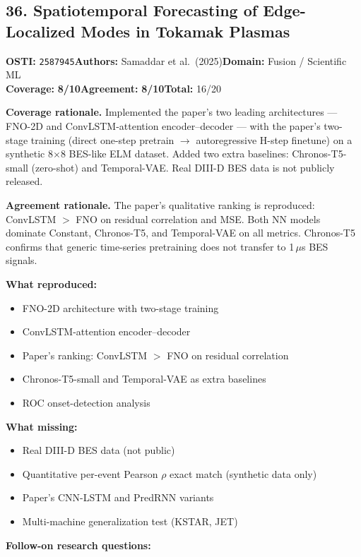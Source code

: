 \documentclass[11pt]{article}
\newcommand{\scorebadge}[2]{\textbf{#1:} \textbf{#2/10}}
\begin{document}
\subsection{36. Spatiotemporal Forecasting of Edge-Localized Modes in Tokamak Plasmas}
\textbf{OSTI:} \texttt{2587945}\quad\textbf{Authors:} Samaddar et al.\ (2025)\quad\textbf{Domain:} Fusion / Scientific ML\\
\scorebadge{Coverage}{8}\quad\scorebadge{Agreement}{8}\quad\textbf{Total:} 16/20\par\smallskip
\noindent\textbf{Coverage rationale.} Implemented the paper's two leading architectures --- FNO-2D and ConvLSTM-attention encoder--decoder --- with the paper's two-stage training (direct one-step pretrain $\rightarrow$ autoregressive H-step finetune) on a synthetic 8$\times$8 BES-like ELM dataset. Added two extra baselines: Chronos-T5-small (zero-shot) and Temporal-VAE. Real DIII-D BES data is not publicly released.\par
\noindent\textbf{Agreement rationale.} The paper's qualitative ranking is reproduced: ConvLSTM $>$ FNO on residual correlation and MSE. Both NN models dominate Constant, Chronos-T5, and Temporal-VAE on all metrics. Chronos-T5 confirms that generic time-series pretraining does not transfer to 1\,$\mu$s BES signals.\par\smallskip
\noindent\textbf{What reproduced:}
\begin{itemize}[leftmargin=1.4em,itemsep=0.2em,topsep=0.2em]
\item FNO-2D architecture with two-stage training
\item ConvLSTM-attention encoder--decoder
\item Paper's ranking: ConvLSTM $>$ FNO on residual correlation
\item Chronos-T5-small and Temporal-VAE as extra baselines
\item ROC onset-detection analysis
\end{itemize}
\noindent\textbf{What missing:}
\begin{itemize}[leftmargin=1.4em,itemsep=0.2em,topsep=0.2em]
\item Real DIII-D BES data (not public)
\item Quantitative per-event Pearson $\rho$ exact match (synthetic data only)
\item Paper's CNN-LSTM and PredRNN variants
\item Multi-machine generalization test (KSTAR, JET)
\end{itemize}
\noindent\textbf{Follow-on research questions:}
\end{document}
